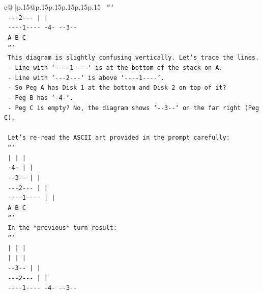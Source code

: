 \documentclass{article}
\begin{document}
{\begin{supertabular}{c@{$\;$}|p{.15\linewidth}@{}p{.15\linewidth}p{.15\linewidth}p{.15\linewidth}p{.15\linewidth}p{.15\linewidth}}
{{{\texttt{        ```} \\
\texttt{          {-}{-}{-}2{-}{-}{-}      |         |    } \\
\texttt{          {-}{-}{-}{-}1{-}{-}{-}{-}    {-}4{-}      {-}{-}3{-}{-}  } \\
\texttt{          A         B         C    } \\
\texttt{        ```} \\
\texttt{        This diagram is slightly confusing vertically. Let's trace the lines.} \\
\texttt{        {-} Line with `{-}{-}{-}{-}1{-}{-}{-}{-}` is at the bottom of the stack on A.} \\
\texttt{        {-} Line with `{-}{-}{-}2{-}{-}{-}` is above `{-}{-}{-}{-}1{-}{-}{-}{-}`.} \\
\texttt{        {-} So Peg A has Disk 1 at the bottom and Disk 2 on top of it?} \\
\texttt{        {-} Peg B has `{-}4{-}`.} \\
\texttt{        {-} Peg C is empty? No, the diagram shows `{-}{-}3{-}{-}` on the far right (Peg C).} \\
\\ 
\texttt{    Let's re{-}read the ASCII art provided in the prompt carefully:} \\
\texttt{    ```} \\
\texttt{        |         |         |    } \\
\texttt{       {-}4{-}        |         |    } \\
\texttt{      {-}{-}3{-}{-}       |         |    } \\
\texttt{     {-}{-}{-}2{-}{-}{-}      |         |    } \\
\texttt{    {-}{-}{-}{-}1{-}{-}{-}{-}     |         |    } \\
\texttt{        A         B         C    } \\
\texttt{    ```} \\
\texttt{    In the *previous* turn result:} \\
\texttt{    ```} \\
\texttt{        |         |         |    } \\
\texttt{        |         |         |    } \\
\texttt{      {-}{-}3{-}{-}       |         |    } \\
\texttt{     {-}{-}{-}2{-}{-}{-}      |         |    } \\
\texttt{    {-}{-}{-}{-}1{-}{-}{-}{-}    {-}4{-}      {-}{-}3{-}{-}  } \\
}}}
\end{supertabular}}
\end{document}
